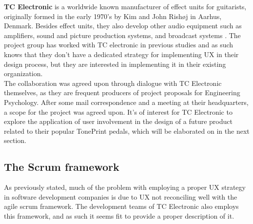 \noindent
\textbf{TC Electronic} is a worldwide known manufacturer of effect units for guitarists, originally formed in the early 1970's by Kim and John Rishøj in Aarhus, Denmark. Besides effect units, they also develop other audio equipment such as amplifiers, sound and picture production systems, and broadcast systems \parencite{WEB:TCElectronic}. The project group has worked with TC electronic in previous studies and as such knows that they don't have a dedicated strategy for implementing UX in their design process, but they are interested in implementing it in their existing organization.\\

\noindent
The collaboration was agreed upon through dialogue with TC Electronic themselves, as they are frequent producers of project proposals for Engineering Psychology. After some mail correspondence and a meeting at their headquarters, a scope for the project was agreed upon. It's of interest for TC Electronic to explore the application of user involvement in the design of a future product related to their popular TonePrint pedals, which will be elaborated on in the next section.

\subsection{The Scrum framework}
\label{scrum}
As previously stated, much of the problem with employing a proper UX strategy in software development companies is due to UX not reconciling well with the agile scrum framework. The development teams of TC Electronic also employs this framework, and as such it seems fit to provide a proper description of it.

